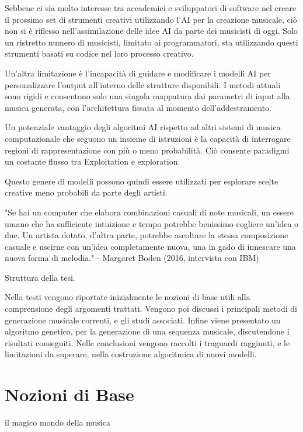 \documentclass[a4paper,12pt]{report}
\begin{document}
Sebbene ci sia molto interesse tra accademici e sviluppatori di software nel creare il prossimo set di strumenti creativi utilizzando l'AI per la creazione musicale, 
ciò non si è riflesso nell'assimilazione delle idee AI da parte dei musicisti di oggi. 
Solo un ristretto numero di musicisti, limitato ai programmatori, sta utilizzando questi strumenti basati su codice nel loro processo creativo.

Un'altra limitazione è l'incapacità di guidare e modificare i modelli AI per personalizzare l'output all'interno delle strutture disponibili. 
I metodi attuali sono rigidi e consentono solo una singola mappatura dai parametri di input alla musica generata, con l'architettura fissata al momento dell'addestramento. 

Un potenziale vantaggio degli algoritmi AI rispetto ad altri sistemi di musica computazionale che seguono un insieme di istruzioni è la capacità di interrogare regioni di rappresentazione con più o meno probabilità. 
Ciò consente paradigmi un costante flusso tra Exploitation e exploration. 

Questo genere di modelli possono quindi essere utilizzati per esplorare scelte creative meno probabili da parte degli artisti.

"Se hai un computer che elabora combinazioni casuali di note musicali, un essere umano che ha sufficiente intuizione e tempo potrebbe benissimo cogliere un'idea o due. 
Un artista dotato, d'altra parte, potrebbe ascoltare la stessa composizione casuale e uscirne con un'idea completamente nuova, una in gado di innescare una nuova forma di melodia."
- Margaret Boden (2016, intervista con IBM)

Struttura della tesi.

Nella testi vengono riportate inizialmente le nozioni di base utili alla comprensione degli argomenti trattati.
Vengono poi discussi i principali metodi di generazione musicale correnti, e gli studi associati.
Infine viene presentato un algoritmo genetico, per la generazione di una sequenza musicale, discutendone i risultati conseguiti.
Nelle conclusioni vengono raccolti i traguardi raggiunti, e le limitazioni da superare, nella costruzione algoritmica di nuovi modelli.

\chapter{Nozioni di Base}

il magico mondo della musica
\end{document}
